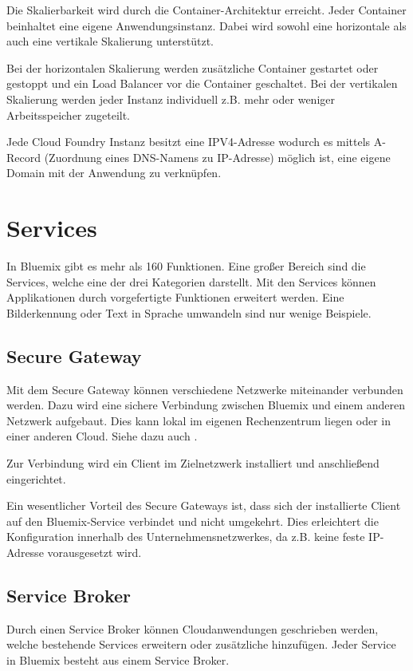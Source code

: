 Die Skalierbarkeit wird durch die Container-Architektur erreicht. Jeder Container beinhaltet eine eigene Anwendungsinstanz.
Dabei wird sowohl eine horizontale als auch eine vertikale Skalierung unterstützt.

Bei der horizontalen Skalierung werden zusätzliche Container gestartet oder gestoppt und ein Load Balancer vor die Container
geschaltet. Bei der vertikalen Skalierung werden jeder Instanz individuell z.B. mehr oder weniger Arbeitsspeicher zugeteilt.

Jede Cloud Foundry Instanz besitzt eine IPV4-Adresse wodurch es mittels A-Record (Zuordnung eines DNS-Namens zu IP-Adresse)
möglich ist, eine eigene Domain mit der Anwendung zu verknüpfen.

\section{Services}
In Bluemix gibt es mehr als 160 Funktionen. Eine großer Bereich sind die Services, welche eine
der drei Kategorien darstellt. Mit den Services können Applikationen durch vorgefertigte Funktionen erweitert werden.
Eine Bilderkennung oder Text in Sprache umwandeln sind nur wenige Beispiele.

\subsection{Secure Gateway}
Mit dem Secure Gateway können verschiedene Netzwerke miteinander verbunden werden. Dazu wird eine sichere Verbindung
zwischen Bluemix und einem anderen Netzwerk aufgebaut. Dies kann lokal im eigenen Rechenzentrum liegen oder in einer
anderen Cloud. Siehe dazu auch \cite{online_grundlagen_securegateway}.

Zur Verbindung wird ein Client im Zielnetzwerk installiert und anschließend eingerichtet.

Ein wesentlicher Vorteil des Secure Gateways ist, dass sich der installierte Client auf den Bluemix-Service verbindet und
nicht umgekehrt. Dies erleichtert die Konfiguration innerhalb des Unternehmensnetzwerkes, da z.B. keine feste IP-Adresse
vorausgesetzt wird.

\subsection{Service Broker}
Durch einen Service Broker können Cloudanwendungen geschrieben werden, welche bestehende Services erweitern oder
zusätzliche hinzufügen. Jeder Service in Bluemix besteht aus einem Service Broker.

